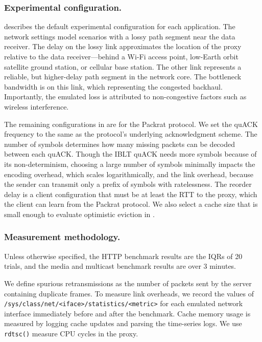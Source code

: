 

\subsubsection{Experimental configuration.}

 describes the default experimental configuration
for each application. The network settings model scenarios with a lossy path
segment near the data receiver. The delay on the lossy link approximates the
location of the proxy relative to the data receiver---behind a Wi-Fi access
point, low-Earth orbit satellite ground station, or cellular base station.
The other link represents a reliable, but higher-delay path segment in the
network core. The bottleneck bandwidth is on this link, which
representing the congested backhaul. Importantly, the emulated loss is
attributed to non-congestive factors such as wireless interference.

The remaining configurations in  are for the Packrat
protocol. We set the quACK frequency to the same as the protocol's underlying
acknowledgment scheme. The number of symbols determines how many missing
packets can be decoded between each quACK. Though the IBLT quACK needs more symbols
because of its non-determinism, choosing a large number of symbols minimally
impacts the encoding overhead, which scales logarithmically, and the link
overhead, because the sender can transmit only a prefix of symbols
with ratelessness.
The reorder delay is a client configuration that
must be at least the RTT to the proxy, which the client can learn from the Packrat
protocol. We also select a cache size that is small enough to evaluate
optimistic eviction in .

\subsubsection{Measurement methodology.}

Unless otherwise specified, the HTTP benchmark results are the IQRs of
20 trials, and the media and multicast benchmark results are over 3 minutes.

We define spurious retransmissions as the number of packets sent by the server
containing duplicate frames. To measure link overheads, we record the values
of \texttt{/sys/class/net/<iface>/statistics/<metric>} for each emulated
network interface immediately before and after the benchmark. Cache memory
usage is measured by logging cache updates and parsing the time-series logs. We
use \texttt{rdtsc()} measure CPU cycles in the proxy.

